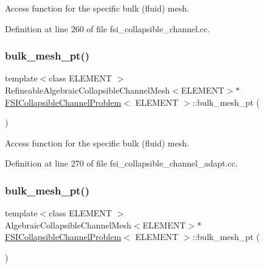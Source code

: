 Access function for the specific bulk (fluid) mesh. 



Definition at line 260 of file fsi\+\_\+collapsible\+\_\+channel.\+cc.

\mbox{\label{classFSICollapsibleChannelProblem_afa3825057e5875deda297c68eb893f74}} 
\subsubsection{\texorpdfstring{bulk\+\_\+mesh\+\_\+pt()}{bulk\_mesh\_pt()}\hspace{0.1cm}{\footnotesize\ttfamily [3/6]}}
{\footnotesize\ttfamily template$<$class E\+L\+E\+M\+E\+NT $>$ \\
Refineable\+Algebraic\+Collapsible\+Channel\+Mesh$<$E\+L\+E\+M\+E\+NT$>$$\ast$ \hyperlink{classFSICollapsibleChannelProblem}{F\+S\+I\+Collapsible\+Channel\+Problem}$<$ E\+L\+E\+M\+E\+NT $>$\+::bulk\+\_\+mesh\+\_\+pt (\begin{DoxyParamCaption}{ }\end{DoxyParamCaption})\hspace{0.3cm}{\ttfamily [inline]}}



Access function for the specific bulk (fluid) mesh. 



Definition at line 270 of file fsi\+\_\+collapsible\+\_\+channel\+\_\+adapt.\+cc.

\mbox{\label{classFSICollapsibleChannelProblem_a9b461f3afef3185ea0b461714675ef8f}} 
\subsubsection{\texorpdfstring{bulk\+\_\+mesh\+\_\+pt()}{bulk\_mesh\_pt()}\hspace{0.1cm}{\footnotesize\ttfamily [4/6]}}
{\footnotesize\ttfamily template$<$class E\+L\+E\+M\+E\+NT $>$ \\
Algebraic\+Collapsible\+Channel\+Mesh$<$E\+L\+E\+M\+E\+NT$>$$\ast$ \hyperlink{classFSICollapsibleChannelProblem}{F\+S\+I\+Collapsible\+Channel\+Problem}$<$ E\+L\+E\+M\+E\+NT $>$\+::bulk\+\_\+mesh\+\_\+pt (\begin{DoxyParamCaption}{ }\end{DoxyParamCaption})\hspace{0.3cm}{\ttfamily [inline]}}



